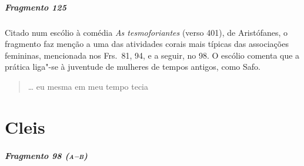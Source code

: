 {\paragraph{Fragmento 125}

{\small Citado num escólio à comédia \textit{As tesmoforiantes} (verso 401), de Aristófanes, o fragmento faz menção a uma das atividades corais mais típicas das associações femininas, mencionada nos Frs.~81, 94, e a seguir, no 98. O escólio comenta que a prática liga"-se à juventude de mulheres de tempos antigos, como Safo.}

\begin{verse}
\ldots{} eu mesma em meu tempo tecia 
\end{verse}


\chapter{Cleis}

\paragraph{Fragmento 98 (\textsc{a--b})}

}
